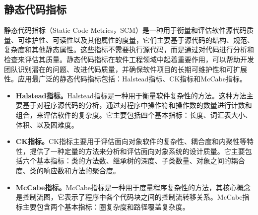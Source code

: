 \subsection{静态代码指标}
静态代码指标（Static Code Metrics，SCM）是一种用于衡量和评估软件源代码质量、可维护性、可读性以及其他属性的度量，它们主要基于源代码的结构、规范、复杂度和其他静态属性。这些指标不需要执行源代码，而是通过对代码进行分析和检查来评估其质量。静态代码指标在软件工程领域中起着重要作用，可以帮助开发团队识别潜在的问题、改进代码质量，并确保软件项目的长期可维护性和可扩展性。应用最广泛的静态代码指标包括：Halstead指标\cite{halstead}、CK指标\cite{ckmetrics}和McCabe指标\cite{mccabe}。
\begin{itemize}
    \item \textbf{Halstead指标。}Halstead指标是一种用于衡量软件复杂性的方法。这种方法主要基于对程序源代码的分析，通过对程序中操作符和操作数的数量进行计数和组合，来评估软件的复杂度。它主要包括四个基本指标：长度、词汇表大小、体积、以及困难度。
    \item \textbf{CK指标。}CK指标主要用于评估面向对象软件的复杂性、耦合度和内聚性等特性，提供了一种定量的方法来分析和评估面向对象系统的设计质量。它主要包括六个基本指标：类的方法数、继承树的深度、子类数量、对象之间的耦合度、类的响应数和方法的聚合度。
    \item \textbf{McCabe指标。}McCabe指标是一种用于度量程序复杂性的方法，其核心概念是控制流图，它表示了程序中各个代码块之间的控制流转移关系。McCabe指标主要包含两个基本指标：圈复杂度和路径覆盖复杂度。
\end{itemize}
